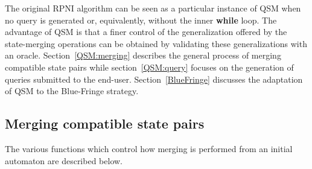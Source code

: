The original RPNI algorithm can be seen as a particular instance of \textsc{QSM} when no query is generated or, equivalently, without the inner \textbf{while} loop. The advantage of \textsc{QSM} is that a finer control of the generalization offered by the state-merging operations can be obtained by validating these generalizations with an oracle. Section~\ref{QSM:merging} describes the general process of merging compatible state pairs while section~\ref{QSM:query} focuses on the generation of queries submitted to the end-user. Section~\ref{BlueFringe} discusses the adaptation of \textsc{QSM} to the Blue-Fringe strategy.

\subsection{Merging compatible state pairs\label{QSM:merging}}

The various functions which control how merging is performed from an initial automaton are described below. 

